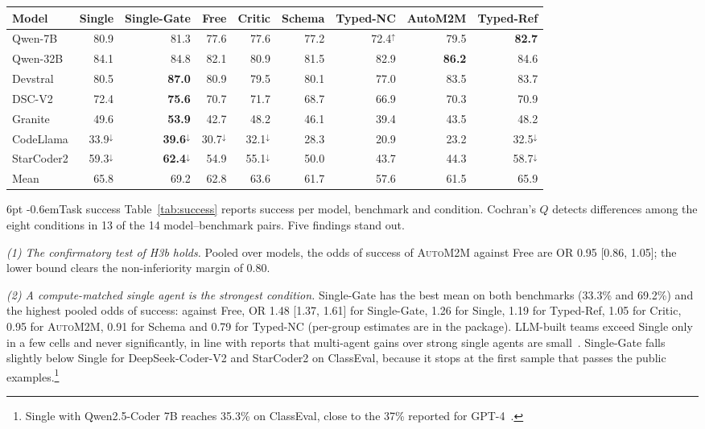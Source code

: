 \documentclass[pdflatex,sn-mathphys-num]{sn-jnl}
\makeatletter
\theoremstyle{thmstyleone}%
\theoremstyle{thmstyletwo}%
\theoremstyle{thmstylethree}%
\newcommand{\auto}{\textsc{AutoM2M}}
\renewcommand\paragraph{\@startsection{paragraph}{4}{\z@}%
  {6pt \@plus 2pt \@minus 1pt}{-0.6em}{\normalfont\normalsize\bfseries}}
\makeatother
\begin{document}
\begin{table}[t]
\medskip
\begin{tabular}{@{}l rrrrrrrr@{}}
\toprule
Model & Single & Single-Gate & Free & Critic & Schema & Typed-NC & AutoM2M & Typed-Ref \\
\midrule
Qwen-7B & 80.9 & 81.3 & 77.6 & 77.6 & 77.2 & 72.4$^{\uparrow}$ & 79.5 & \textbf{82.7} \\
Qwen-32B & 84.1 & 84.8 & 82.1 & 80.9 & 81.5 & 82.9 & \textbf{86.2} & 84.6 \\
Devstral & 80.5 & \textbf{87.0} & 80.9 & 79.5 & 80.1 & 77.0 & 83.5 & 83.7 \\
DSC-V2 & 72.4 & \textbf{75.6} & 70.7 & 71.7 & 68.7 & 66.9 & 70.3 & 70.9 \\
Granite & 49.6 & \textbf{53.9} & 42.7 & 48.2 & 46.1 & 39.4 & 43.5 & 48.2 \\
CodeLlama & 33.9$^{\downarrow}$ & \textbf{39.6}$^{\downarrow}$ & 30.7$^{\downarrow}$ & 32.1$^{\downarrow}$ & 28.3 & 20.9 & 23.2 & 32.5$^{\downarrow}$ \\
StarCoder2 & 59.3$^{\downarrow}$ & \textbf{62.4}$^{\downarrow}$ & 54.9 & 55.1$^{\downarrow}$ & 50.0 & 43.7 & 44.3 & 58.7$^{\downarrow}$ \\
\midrule
Mean & 65.8 & 69.2 & 62.8 & 63.6 & 61.7 & 57.6 & 61.5 & 65.9 \\
\bottomrule
\end{tabular}
\end{table}

\paragraph{Task success} Table~\ref{tab:success} reports success per model,
benchmark and condition. Cochran's $Q$ detects differences among the eight
conditions in 13 of the 14 model--benchmark pairs. Five findings stand out.

\emph{(1) The confirmatory test of H3b holds.} Pooled over models, the odds of
success of \auto{} against Free are OR 0.95 [0.86, 1.05]; the lower bound
clears the non-inferiority margin of 0.80.

\emph{(2) A compute-matched single agent is the strongest condition.}
Single-Gate has the best mean on both benchmarks (33.3\% and 69.2\%) and the
highest pooled odds of success: against Free, OR 1.48 [1.37, 1.61] for
Single-Gate, 1.26 for Single, 1.19 for Typed-Ref, 1.05 for Critic, 0.95 for
\auto{}, 0.91 for Schema and 0.79 for Typed-NC (per-group estimates are in the
package). LLM-built teams exceed Single only in a few cells and never
significantly, in line with reports that multi-agent gains over strong single
agents are small~\cite{cemri2025mast,kim2025scaling}. Single-Gate falls slightly
below Single for DeepSeek-Coder-V2 and StarCoder2 on ClassEval, because it stops
at the first sample that passes the public examples.\footnote{Single with
Qwen2.5-Coder 7B reaches 35.3\% on ClassEval, close to the 37\% reported for
GPT-4~\cite{du2024classeval}.}
\end{document}

